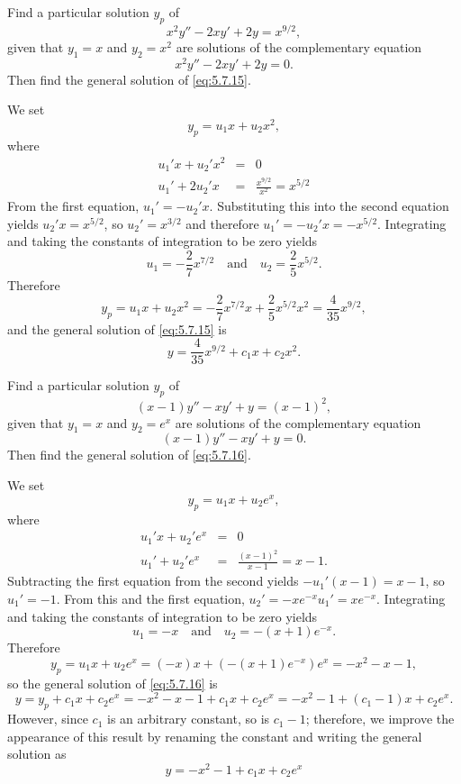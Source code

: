 \documentclass{ximera}
\begin{document}
\begin{example}\label{example:5.7.1}
 Find a particular
solution $y_p$ of
\begin{equation} \label{eq:5.7.15}
x^2y''-2xy'+2y=x^{9/2},
\end{equation}
given that $y_1=x$ and $y_2=x^2$ are solutions of the complementary
equation
$$
x^2y''-2xy'+2y=0.
$$
 Then find the general solution of \eqref{eq:5.7.15}.


\begin{explanation}
We set
$$
y_p=u_1x+u_2x^2,
$$
where
\begin{eqnarray*}
u_1'x+u_2'x^2&=&0\\
u_1'+2u_2'x&=&\frac{x^{9/2}}{x^2}=x^{5/2}
\end{eqnarray*}
From the first equation, $u_1'=-u_2'x$. Substituting this into the
second equation yields $u_2'x=x^{5/2}$, so $u_2'=x^{3/2}$ and
therefore $u_1'=-u_2'x=-x^{5/2}$. Integrating and taking the constants
of integration to be zero yields
$$
u_1=-\frac{2}{7}x^{7/2}\quad\mbox{and}\quad u_2=\frac{2}{5}x^{5/2}.
$$
Therefore
$$
y_p=u_1x+u_2x^2
=-\frac{2}{7}x^{7/2}x+\frac{2}{5}x^{5/2}x^2=\frac{4}{35}x^{9/2},
$$
and the general solution of  \eqref{eq:5.7.15} is
$$
y=\frac{4}{35}x^{9/2}+c_1x+c_2x^2.
$$
\end{explanation}
\end{example}

\begin{example}\label{example:5.7.2}
 Find a particular
solution $y_p$ of
\begin{equation} \label{eq:5.7.16}
(x-1)y''-xy'+y=(x-1)^2,
\end{equation}
given that $y_1=x$ and $y_2=e^x$ are solutions of the complementary
equation
$$
(x-1)y''-xy'+y=0.
$$
 Then find the general solution of \eqref{eq:5.7.16}.

\begin{explanation}
We set
$$
y_p=u_1x+u_2e^x,
$$
where
\begin{eqnarray*}
u_1'x+u_2'e^x&=&0\\
u_1'+u_2'e^x&=&\frac{(x-1)^2}{x-1}=x-1.
\end{eqnarray*}
Subtracting the first equation from the second yields
$-u_1'(x-1)=x-1$, so $u_1'=-1$. From this and the first equation,
$u_2'=-xe^{-x}u_1'=xe^{-x}$.
Integrating and taking the constants of integration to be zero yields
$$
u_1=-x  \quad\mbox{and}\quad u_2=-(x+1)e^{-x}.
$$
Therefore
$$
y_p=u_1x+u_2e^x
=(-x)x+(-(x+1)e^{-x})e^x=-x^2-x-1,
$$
so the general solution of \eqref{eq:5.7.16} is
\begin{equation} \label{eq:5.7.17}
y=y_p+c_1x+c_2e^x=-x^2-x-1+c_1x+c_2e^x = -x^2-1+(c_1-1)x+c_2e^x.
\end{equation}
However, since $c_1$ is an arbitrary constant, so is $c_1-1$;
therefore, we  improve the appearance of this result by
renaming the constant and writing the general solution as
\begin{equation} \label{eq:5.7.18}
y= -x^2-1+c_1x+c_2e^x
\end{equation}
\end{explanation}
\end{example}
\end{document}
